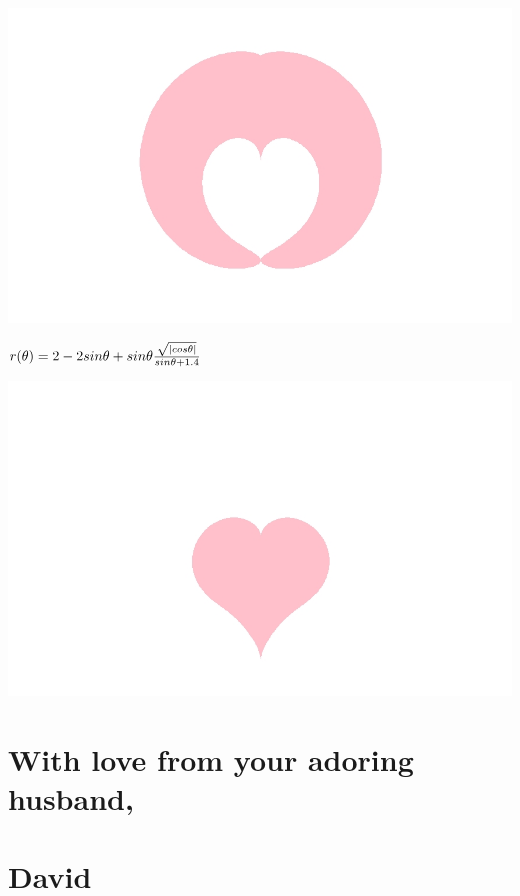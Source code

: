 \documentclass[
]{article}
\begin{document}
\includegraphics[width=0.5\linewidth]{Heart1}

\(\LARGE r(\theta) = 2-2sin\theta+sin\theta \frac{\sqrt{\lvert cos\theta \rvert}}{sin\theta + 1.4} \hspace{1.2cm}\)

\includegraphics[width=0.5\linewidth]{Heart2}

\hypertarget{with-love-from-your-adoring-husband}{%
\section{With love from your adoring
husband,}\label{with-love-from-your-adoring-husband}}

\hypertarget{david}{%
\section{David}\label{david}}
\end{document}
